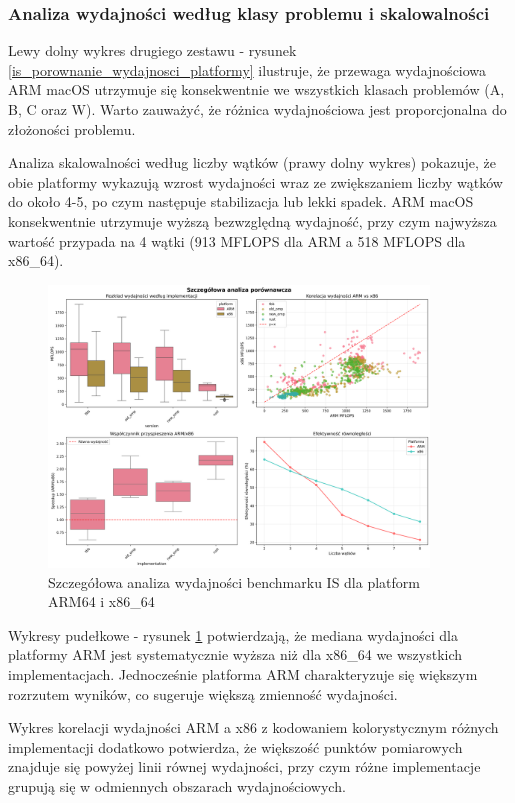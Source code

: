 \subsubsection{Analiza wydajności według klasy problemu i skalowalności}
Lewy dolny wykres drugiego zestawu - rysunek \ref{is_porownanie_wydajnosci_platformy} ilustruje, że przewaga wydajnościowa ARM macOS utrzymuje się konsekwentnie we wszystkich klasach problemów (A, B, C oraz W). Warto zauważyć, że różnica wydajnościowa jest proporcjonalna do złożoności problemu.

Analiza skalowalności według liczby wątków (prawy dolny wykres) pokazuje, że obie platformy wykazują wzrost wydajności wraz ze zwiększaniem liczby wątków do około 4-5, po czym następuje stabilizacja lub lekki spadek. ARM macOS konsekwentnie utrzymuje wyższą bezwzględną wydajność, przy czym najwyższa wartość przypada na 4 wątki (913 MFLOPS dla ARM a 518 MFLOPS dla x86\_64).

\begin{figure}[!h]
    \centering
    \includegraphics[width=0.9\textwidth]{analiza/images/parallel/is/compare/is_szczegolowa_analiza_wydajnosci.png}
    \caption{Szczegółowa analiza wydajności benchmarku IS dla platform ARM64 i x86\_64}
    \label{is_szczegolowa_analiza_wydajnosci}
\end{figure}
Wykresy pudełkowe - rysunek \ref{is_szczegolowa_analiza_wydajnosci} potwierdzają, że mediana wydajności dla platformy ARM jest systematycznie wyższa niż dla x86\_64 we wszystkich implementacjach. Jednocześnie platforma ARM charakteryzuje się większym rozrzutem wyników, co sugeruje większą zmienność wydajności.

Wykres korelacji wydajności ARM a x86 z kodowaniem kolorystycznym różnych implementacji dodatkowo potwierdza, że większość punktów pomiarowych znajduje się powyżej linii równej wydajności, przy czym różne implementacje grupują się w odmiennych obszarach wydajnościowych.

